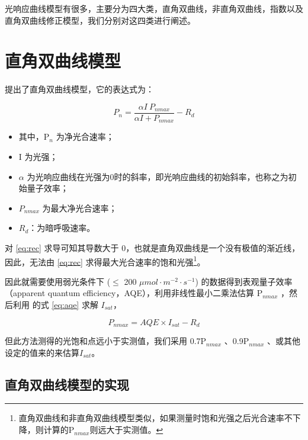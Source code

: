 \documentclass[]{krantz}
\providecommand{\tightlist}{%
  \setlength{\itemsep}{0pt}\setlength{\parskip}{0pt}}
\theoremstyle{definition}
\theoremstyle{definition}
\theoremstyle{definition}
\theoremstyle{remark}
\begin{document}
光响应曲线模型有很多，主要分为四大类，直角双曲线，非直角双曲线，指数以及直角双曲线修正模型，我们分别对这四类进行阐述。

\section{直角双曲线模型}\label{rec_mod}

\citet{BalyEC1935} 提出了直角双曲线模型，它的表达式为：

\begin{equation}
P_{n}  = \frac{\alpha I\ P_{nmax}}{\alpha I + P_{nmax}}- R_{d}
\label{eq:rec}
\end{equation}

\begin{itemize}
\tightlist
\item
  其中，P\(_{n}\) 为净光合速率；
\item
  I 为光强；
\item
  \(\alpha\)
  为光响应曲线在光强为0时的斜率，即光响应曲线的初始斜率，也称之为初始量子效率；
\item
  \(P_{nmax}\) 为最大净光合速率；
\item
  \(R_{d}\)：为暗呼吸速率。
\end{itemize}

对 \eqref{eq:rec} 求导可知其导数大于
0，也就是直角双曲线是一个没有极值的渐近线，因此，无法由 \eqref{eq:rec}
求得最大光合速率的饱和光强\footnote{直角双曲线和非直角双曲线模型类似，如果测量时饱和光强之后光合速率不下降，则计算的P\(_{nmax}\)则远大于实测值。}。

因此就需要使用弱光条件下 (\(\leq\) 200
\(\mu mol\cdot m^{-2}\cdot s^{-1}\)) 的数据得到表观量子效率（apparent
quantum efficiency，AQE），利用非线性最小二乘法估算 P\(_{nmax}\)
，然后利用 \citet{YEZiPiao2010} 的式 \eqref{eq:aqe} 求解 \(I_{sat}\)，

\begin{equation}
P_{nmax}= AQE \times I_{sat} - R_{d}
\label{eq:aqe}
\end{equation}

但此方法测得的光饱和点远小于实测值，我们采用 0.7P\(_{nmax}\)
\citet{ZhangXS2009}、0.9P\(_{nmax}\)
\citet{HuangHY2009}、或其他设定的值来的来估算\(I_{sat}\)。

\subsection{直角双曲线模型的实现}\label{rec_fit}
\end{document}
